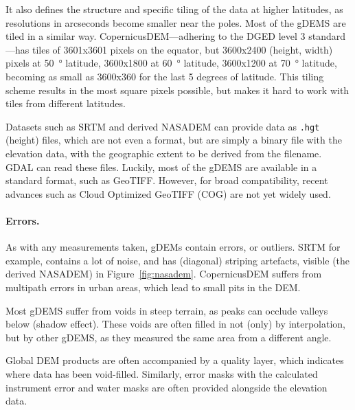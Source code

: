 It also defines the structure and specific tiling of the data at higher latitudes, as resolutions in arcseconds become smaller near the poles.
Most of the gDEMS are tiled in a similar way.
CopernicusDEM---adhering to the DGED level 3 standard---has tiles of 3601x3601 pixels on the equator, but 3600x2400 (height, width) pixels at \qty{50}{\degree} latitude, 3600x1800 at \qty{60}{\degree} latitude, 3600x1200 at \qty{70}{\degree} latitude, becoming as small as 3600x360 for the last 5 degrees of latitude.
This tiling scheme results in the most square pixels possible, but makes it hard to work with tiles from different latitudes.

Datasets such as SRTM and derived NASADEM can provide data as \texttt{.hgt} (height) files, which are not even a format, but are simply a binary file with the elevation data, with the geographic extent to be derived from the filename.
GDAL can read these files.
Luckily, most of the gDEMS are available in a standard format, such as GeoTIFF\@.
However, for broad compatibility, recent advances such as Cloud Optimized GeoTIFF (COG) are not yet widely used.


\paragraph{Errors.}
As with any measurements taken, gDEMs contain errors, or outliers.
SRTM for example, contains a lot of noise, and has (diagonal) striping artefacts, visible (the derived NASADEM) in Figure~\ref{fig:nasadem}.
CopernicusDEM suffers from multipath errors in urban areas, which lead to small pits in the DEM.

Most gDEMS suffer from voids in steep terrain, as peaks can occlude valleys below (shadow effect).
These voids are often filled in not (only) by interpolation, but by other gDEMS, as they measured the same area from a different angle.


Global DEM products are often accompanied by a quality layer, which indicates where data has been void-filled.
Similarly, error masks with the calculated instrument error and water masks are often provided alongside the elevation data.

